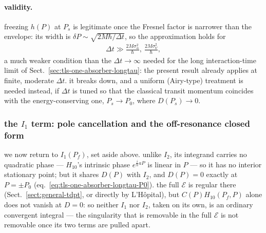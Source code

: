 \paragraph{validity.} freezing $h(P)$ at $P_s$ is legitimate once the Fresnel factor is narrower than the envelope: its width is $\delta P\sim\sqrt{2M\hbar/\Delta t}$, so the approximation holds for
\begin{align}
    \Delta t \gg \frac{2M\sigma_\alpha^2}{\hbar},\ \frac{2M\sigma_V^2}{\hbar},
\end{align}
a much weaker condition than the $\Delta t\to\infty$ needed for the long interaction-time limit of Sect.~\ref{sec:tls-one-absorber-longtau}: the present result already applies at finite, moderate $\Delta t$. it breaks down, and a uniform (Airy-type) treatment is needed instead, if $\Delta t$ is tuned so that the classical transit momentum coincides with the energy-conserving one, $P_s\to P_0$, where $D(P_s)\to0$.

\subsubsection{the $I_1$ term: pole cancellation and the off-resonance closed form}
we now return to $I_1(P_f)$, set aside above. unlike $I_2$, its integrand carries no quadratic phase --- $H_{10}$'s intrinsic phase $e^{\frac{i}{\hbar}aP}$ is linear in $P$ --- so it has no interior stationary point; but it shares $D(P)$ with $I_2$, and $D(P)=0$ exactly at $P=\pm P_0$ (eq.~\eqref{eq:tls-one-absorber-longtau-P0}). the full $\mathcal E$ is regular there (Sect.~\ref{sect:general-tdpt}, or directly by L'H\^opital), but $C(P)H_{10}(P_f,P)$ alone does not vanish at $D=0$: so neither $I_1$ nor $I_2$, taken on its own, is an ordinary convergent integral --- the singularity that is removable in the full $\mathcal E$ is not removable once its two terms are pulled apart.

